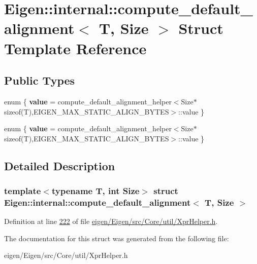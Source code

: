 \hypertarget{struct_eigen_1_1internal_1_1compute__default__alignment}{}\section{Eigen\+:\+:internal\+:\+:compute\+\_\+default\+\_\+alignment$<$ T, Size $>$ Struct Template Reference}
\label{struct_eigen_1_1internal_1_1compute__default__alignment}
\subsection*{Public Types}
\begin{DoxyCompactItemize}
\item 
\mbox{\label{struct_eigen_1_1internal_1_1compute__default__alignment_aad2bf089b30d53dd0ca31f18aef3a3e6}} 
enum \{ {\bfseries value} = compute\+\_\+default\+\_\+alignment\+\_\+helper$<$Size$\ast$sizeof(T),E\+I\+G\+E\+N\+\_\+\+M\+A\+X\+\_\+\+S\+T\+A\+T\+I\+C\+\_\+\+A\+L\+I\+G\+N\+\_\+\+B\+Y\+T\+ES$>$\+:\+:value
 \}
\item 
\mbox{\label{struct_eigen_1_1internal_1_1compute__default__alignment_afd269f84947a221259cb3dfc30ad1fdc}} 
enum \{ {\bfseries value} = compute\+\_\+default\+\_\+alignment\+\_\+helper$<$Size$\ast$sizeof(T),E\+I\+G\+E\+N\+\_\+\+M\+A\+X\+\_\+\+S\+T\+A\+T\+I\+C\+\_\+\+A\+L\+I\+G\+N\+\_\+\+B\+Y\+T\+ES$>$\+:\+:value
 \}
\end{DoxyCompactItemize}


\subsection{Detailed Description}
\subsubsection*{template$<$typename T, int Size$>$\newline
struct Eigen\+::internal\+::compute\+\_\+default\+\_\+alignment$<$ T, Size $>$}



Definition at line \hyperlink{eigen_2_eigen_2src_2_core_2util_2_xpr_helper_8h_source_l00222}{222} of file \hyperlink{eigen_2_eigen_2src_2_core_2util_2_xpr_helper_8h_source}{eigen/\+Eigen/src/\+Core/util/\+Xpr\+Helper.\+h}.



The documentation for this struct was generated from the following file\+:\begin{DoxyCompactItemize}
\item 
eigen/\+Eigen/src/\+Core/util/\+Xpr\+Helper.\+h\end{DoxyCompactItemize}
